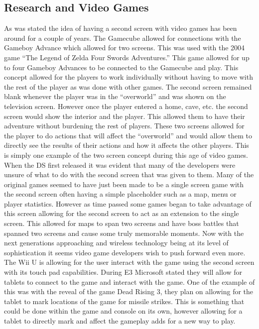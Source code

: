 \documentclass[11pt]{article}
\begin{document}
\subsection{Research and Video Games}
As was stated the idea of having a second screen with video games has been around for a couple of years. The Gamecube allowed for connections with the Gameboy Advance which allowed for two screens. This was used with the 2004 game “The Legend of Zelda Four Swords Adventures.” This game allowed for up to four Gameboy Advances to be connected to the Gamecube and play. This concept allowed for the players to work individually without having to move with the rest of the player as was done with other games. The second screen remained blank whenever the player was in the “overworld” and was shown on the television screen. However once the player entered a home, cave, etc. the second screen would show the interior and the player. This allowed them to have their adventure without burdening the rest of players. These two screens allowed for the player to do actions that will affect the “overworld” and would allow them to directly see the results of their actions and how it affects the other players. This is simply one example of the two screen concept during this age of video games. When the DS first released it was evident that many of the developers were unsure of what to do with the second screen that was given to them. Many of the original games seemed to have just been made to be a single screen game with the second screen often having a simple placeholder such as a map, menu or player statistics. However as time passed some games began to take advantage of this screen allowing for the second screen to act as an extension to the single screen. This allowed for maps to span two screens and have boss battles that spanned two screens and cause some truly memorable moments. Now with the next generations approaching and wireless technology being at its level of sophistication it seems video game developers wish to push forward even more. The Wii U is allowing for the user interact with the game using the second screen with its touch pad capabilities. During E3 Microsoft stated they will allow for tablets to connect to the game and interact with the game. One of the example of this was with the reveal of the game Dead Rising 3, they plan on allowing for the tablet to mark locations of the game for missile strikes. This is something that could be done within the game and console on its own, however allowing for a tablet to directly mark and affect the gameplay adds for a new way to play.
\end{document}
